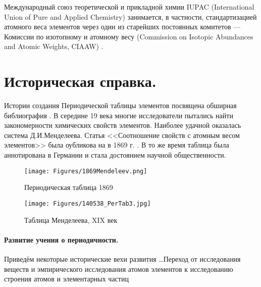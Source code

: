 \documentclass[a5paper,openany]{book}
\begin{document}
Международный союз теоретической 
и прикладной химии IUPAC (International Union of Pure and Applied Chemistry) занимается, в частности, 
стандартизацией атомного веса элементов через один из старейших постоянных комитетов — Комиссии по изотопному и атомному весу (Commission on Isotopic Abundances and Atomic Weights, CIAAW) \cite{CIAAW}.

\section{Историческая справка.}

Истории создания Периодической таблицы элементов посвящена обширная библиография \cite{Trifonov1974, Scerri2019}.
В середине 19 века многие исследователи пытались найти закономерности химических свойств элементов. Наиболее удачной оказалась система Д.И.Менделеева. Статья <<Соотношение свойств с атомным весом элементов>> была оубликова на в 1869 г. \cite{Mendeleev1869ru}. В то же время таблица была аннотирована в Германии \cite{Mendeleev1869} и стала достоянием научной общественности.

\begin{figure}[ht] 
	\centering\small
	\unitlength=1mm
	\texttt{[image: Figures/1869Mendeleev.png]} 
	\caption{Периодическая таблица 1869 \cite{Mendeleev1869}} 
	\label{f:1869Mendeleev}
\end{figure}	

\begin{figure}[h] 
	\centering\small
	\unitlength=1mm
	\texttt{[image: Figures/140538\_PerTab3.jpg]} 
	\caption{Таблица Менделеева, XIX век \cite{MendeleevTable} }
	\label{f:MendeleevTable}
\end{figure}


\paragraph{Развитие учения о периодичности.}
Приведём некоторые исторические вехи развития \cite{Trifonov1974, Scerri2019, Bekman} \ldots Переход от исследования веществ и эмпирического исследования атомов элементов к исследованию строения атомов и элементарных частиц
\end{document}
